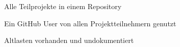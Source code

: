 \begin{frame}
\begin{block}{}
	Alle Teilprojekte in einem Repository
\end{block}
\begin{block}{}
	Ein GitHub User von allen Projektteilnehmern genutzt
\end{block}
\begin{block}{}
	Altlasten vorhanden und undokumentiert
\end{block}
\end{frame}